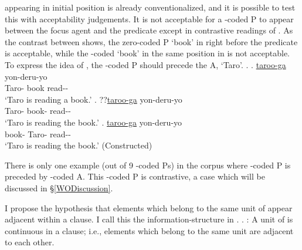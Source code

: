  appearing in initial position is already conventionalized, and
it is possible to test this with acceptability judgements.
It is not acceptable for a -coded P to appear between the focus agent and the predicate except in contrastive readings of .
As the contrast between \Next[a-c] shows,
the zero-coded P  `book' in \Next[a] right before the predicate is acceptable,
while the -coded  `book' in the same position in \Next[b] is not acceptable.
To express the idea of \Next[b],
the -coded P should precede the A,  `Taro'.
%
\ex. \ag. \ul{taroo-ga}  yon-deru-yo \\
		Taro- book read-- \\
		`Taro is reading a book.'
	\bg. ??\ul{taroo-ga}  yon-deru-yo \\
		Taro- book- read-- \\
		`Taro is reading the book.'
	\bg.  \ul{taroo-ga} yon-deru-yo \\
		book- Taro- read-- \\
		`Taro is reading the book.'
		\hfill{(Constructed)}

\largerpage
There is only one example (out of 9 -coded Ps) in the corpus
where -coded P is preceded by -coded A.
This -coded P is contrastive, a case which will be discussed in \S \ref{WODiscussion}.

I propose the hypothesis that elements which belong to the same unit of  appear adjacent within a clause.
I call this the information-structure  in .
%
\ex. \label{IScontinuityP}:
 A unit of  is continuous in a clause;
 i.e., elements which belong to the same unit are adjacent to each other.

